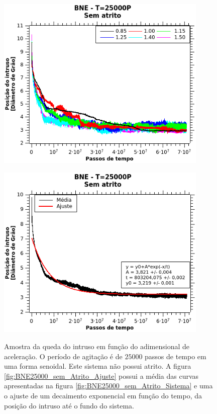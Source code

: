 \begin{figure}
    \centering
    \begin{minipage}{.45\linewidth}
        \includegraphics[width=0.9\textwidth]{04-figuras/BNE25000semAtrito.png}
        \label{fig:BNE25000_sem_Atrito_Sistema}
    \end{minipage}
    \begin{minipage}{.45\linewidth}
        \includegraphics[width=0.9\textwidth]{04-figuras/BNE25000semAtrito_Ajuste.png}
        \label{fig:BNE25000_sem_Atrito_Ajuste}
    \end{minipage}
    \caption{Amostra da queda do intruso em função do adimensional de aceleração. O período de agitação é de $25000$ passos de tempo em uma forma senoidal. Este sistema não possui atrito. A figura \ref{fig:BNE25000_sem_Atrito_Ajuste} possui a média das curvas apresentadas na figura \ref{fig:BNE25000_sem_Atrito_Sistema} e uma o ajuste de um decaimento exponencial em função do tempo, da posição do intruso até o fundo do sistema.}
    \label{fig:BNE25000_sem_Atrito}
\end{figure}

